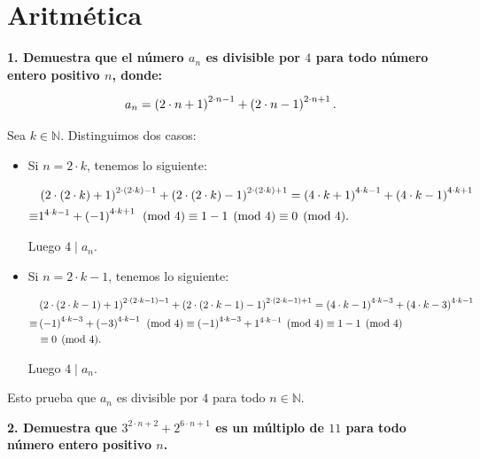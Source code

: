 \chapter{Aritmética}
\textbf{1. Demuestra que el número $a_n$ es divisible por $4$ para todo número entero positivo $n$, donde:}

\begin{equation}
  a_n=\left(2\cdot n+1\right)^{2\cdot n-1}+\left(2\cdot n-1\right)^{2\cdot n+1}.
\end{equation}

Sea $k\in\mathbb{N}$. Distinguimos dos casos:

\begin{itemize}
  \item[1.] Si $n=2\cdot k$, tenemos lo siguiente:
  
  \begin{equation}
    \begin{split}
      & \left(2\cdot\left(2\cdot k\right)+1\right)^{2\cdot\left(2\cdot k\right)-1}+\left(2\cdot\left(2\cdot k\right)-1\right)^{2\cdot\left(2\cdot k\right)+1} =\left(4\cdot k+1\right)^{4\cdot k-1}+\left(4\cdot k-1\right)^{4\cdot k+1}\\
      \equiv &  1^{4\cdot k-1}+\left(-1\right)^{4\cdot k+1}\pmod{4} \equiv 1-1\pmod{4}\equiv 0\pmod{4}.
    \end{split}
  \end{equation}

  Luego $4\mid a_n$.

  \item[2.] Si $n=2\cdot k-1$, tenemos lo siguiente:

  \begin{equation}
    \begin{split}
      & \left(2\cdot\left(2\cdot k-1\right)+1\right)^{2\cdot\left(2\cdot k-1\right)-1}+\left(2\cdot\left(2\cdot k-1\right)-1\right)^{2\cdot\left(2\cdot k-1\right)+1} =\left(4\cdot k-1\right)^{4\cdot k-3}+\left(4\cdot k-3\right)^{4\cdot k-1}\\
      \equiv & \left(-1\right)^{4\cdot k-3}+\left(-3\right)^{4\cdot k-1}\pmod{4} \equiv\left(-1\right)^{4\cdot k-3}+1^{4\cdot k-1}\pmod{4}\equiv 1-1\pmod{4}\\
      & \equiv 0\pmod{4}.
    \end{split}
  \end{equation}
  
  Luego $4\mid a_n$.
\end{itemize}

Esto prueba que $a_n$ es divisible por $4$ para todo $n\in\mathbb{N}$.

\textbf{2. Demuestra que $3^{2\cdot n+2}+2^{6\cdot n+1}$ es un múltiplo de $11$ para todo número entero positivo $n$.}

